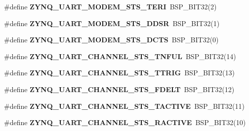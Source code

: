 \begin{DoxyCompactItemize}
\mbox{\label{zynq-uart-regs_8h_ad7261410bb7346ec333c2a13a4789301}} 
\#define {\bfseries Z\+Y\+N\+Q\+\_\+\+U\+A\+R\+T\+\_\+\+M\+O\+D\+E\+M\+\_\+\+S\+T\+S\+\_\+\+T\+E\+RI}~B\+S\+P\+\_\+\+B\+I\+T32(2)
\item 
\mbox{\label{zynq-uart-regs_8h_aa1671b9d1d0abba7544fbf7f67563700}} 
\#define {\bfseries Z\+Y\+N\+Q\+\_\+\+U\+A\+R\+T\+\_\+\+M\+O\+D\+E\+M\+\_\+\+S\+T\+S\+\_\+\+D\+D\+SR}~B\+S\+P\+\_\+\+B\+I\+T32(1)
\item 
\mbox{\label{zynq-uart-regs_8h_af2be70a9b8228cbe78d67896f1e00e5d}} 
\#define {\bfseries Z\+Y\+N\+Q\+\_\+\+U\+A\+R\+T\+\_\+\+M\+O\+D\+E\+M\+\_\+\+S\+T\+S\+\_\+\+D\+C\+TS}~B\+S\+P\+\_\+\+B\+I\+T32(0)
\item 
\mbox{\label{zynq-uart-regs_8h_af5ea668638f43124302828545cfb6062}} 
\#define {\bfseries Z\+Y\+N\+Q\+\_\+\+U\+A\+R\+T\+\_\+\+C\+H\+A\+N\+N\+E\+L\+\_\+\+S\+T\+S\+\_\+\+T\+N\+F\+UL}~B\+S\+P\+\_\+\+B\+I\+T32(14)
\item 
\mbox{\label{zynq-uart-regs_8h_aae203e9be9e35370406c34b5382a65b2}} 
\#define {\bfseries Z\+Y\+N\+Q\+\_\+\+U\+A\+R\+T\+\_\+\+C\+H\+A\+N\+N\+E\+L\+\_\+\+S\+T\+S\+\_\+\+T\+T\+R\+IG}~B\+S\+P\+\_\+\+B\+I\+T32(13)
\item 
\mbox{\label{zynq-uart-regs_8h_a2217d1546fd6cf657cbf338b55c0d4ea}} 
\#define {\bfseries Z\+Y\+N\+Q\+\_\+\+U\+A\+R\+T\+\_\+\+C\+H\+A\+N\+N\+E\+L\+\_\+\+S\+T\+S\+\_\+\+F\+D\+E\+LT}~B\+S\+P\+\_\+\+B\+I\+T32(12)
\item 
\mbox{\label{zynq-uart-regs_8h_a1c2a8b32e8d19f7a07eee8ff21f82885}} 
\#define {\bfseries Z\+Y\+N\+Q\+\_\+\+U\+A\+R\+T\+\_\+\+C\+H\+A\+N\+N\+E\+L\+\_\+\+S\+T\+S\+\_\+\+T\+A\+C\+T\+I\+VE}~B\+S\+P\+\_\+\+B\+I\+T32(11)
\item 
\mbox{\label{zynq-uart-regs_8h_aeea45fd5fc2079ae76511d7b7c61a466}} 
\#define {\bfseries Z\+Y\+N\+Q\+\_\+\+U\+A\+R\+T\+\_\+\+C\+H\+A\+N\+N\+E\+L\+\_\+\+S\+T\+S\+\_\+\+R\+A\+C\+T\+I\+VE}~B\+S\+P\+\_\+\+B\+I\+T32(10)
\item 
\mbox{\label{zynq-uart-regs_8h_acc5f0cbd89137b107562c3906874af69}} 

\end{DoxyCompactItemize}
